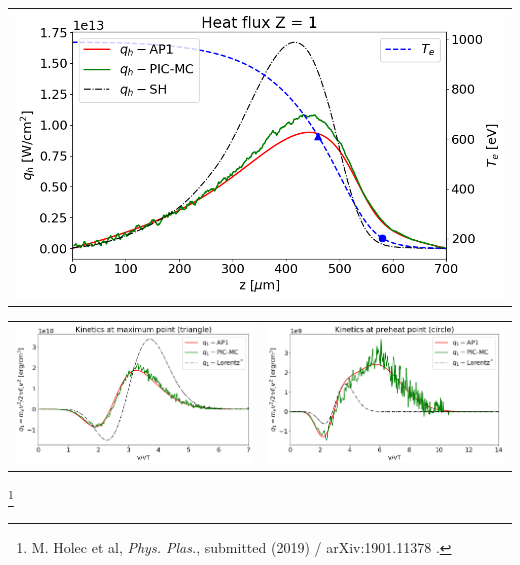 \documentclass[8pt, compress]{beamer}
\begin{document}
\begin{frame}
\begin{center}
\begin{tabular}{c}
\includegraphics[width=\fs\textwidth]{../figures/C7_Calder_case5_heatflux_noSNB.png}
\end{tabular}
\begin{tabular}{cc}
\includegraphics[width=\fs\textwidth]{../figures/C7_Calder_case5_kinetics_noSNB.png}
&
\includegraphics[width=\fs\textwidth]{../figures/C7_Calder_case5_nonlocal_kinetics_noSNB.png}
\end{tabular}
\let\thefootnote\relax\footnote{M. Holec et al, \textit{Phys. Plas.}, submitted (2019) / arXiv:1901.11378 .}
\end{center}
\end{frame}
\end{document}
